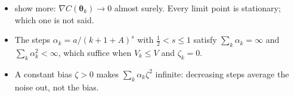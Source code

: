 \documentclass[handoutsbeamer.tex]{subfiles}
\begin{document}
\begin{frame}
\begin{itemize}\setlength\itemsep{0.15em}
    \item \citet{bertsekas2000gradient} show more: $\nabla C(\boldsymbol\theta_k)\to0$ almost surely. Every limit point is stationary; which one is not said.
    \item The steps $\alpha_k = a/(k+1+A)^s$ with $\frac12<s\le1$ satisfy $\sum_k\alpha_k = \infty$ and $\sum_k\alpha_k^2<\infty$, which suffice when $V_k\le V$ and $\zeta_k = 0$.
    \item A constant bias $\zeta>0$ makes $\sum_k\alpha_k\zeta^2$ infinite: decreasing steps average the noise out, not the bias.
\end{itemize}
\end{frame}
\end{document}
